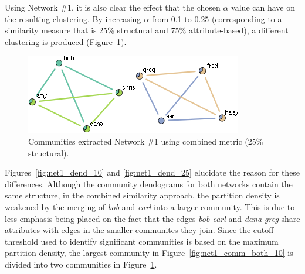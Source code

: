 \documentclass{report} %
\begin{document}
Using Network \#1, it is also clear the effect that the chosen $\alpha$ value can have on the resulting clustering. By increasing $\alpha$ from 0.1 to 0.25 (corresponding to a similarity measure that is 25\% structural and 75\% attribute-based), a different clustering is produced (Figure~\ref{fig:net1_comm_both_25}).\\



\begin{figure}[htp!]
  \centering
  \includegraphics[width=0.5\linewidth]{toy2/ea/edge_comm_0.25.png}
  \caption{Communities extracted Network \#1 using combined metric (25\% structural).}
  \label{fig:net1_comm_both_25}
\end{figure}

Figures~\ref{fig:net1_dend_10} and \ref{fig:net1_dend_25} elucidate the reason for these differences. Although the community dendograms for both networks contain the same structure, in the combined similarity approach, the partition density is weakened by the merging of \textit{bob} and \textit{earl} into a larger community. This is due to less emphasis being placed on the fact that the edges \textit{bob-earl} and \textit{dana-greg} share attributes with edges in the smaller communites they join. Since the cutoff threshold used to identify significant communities is based on the maximum partition density, the largest community in Figure~\ref{fig:net1_comm_both_10} is divided into two communities in Figure~\ref{fig:net1_comm_both_25}.\\
\end{document}
